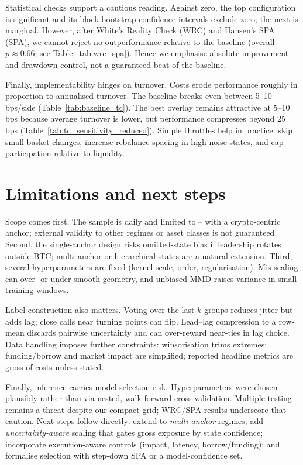 Statistical checks support a cautious reading. Against zero, the top configuration is significant and its block-bootstrap confidence intervals exclude zero; the next is marginal. However, after White’s Reality Check (WRC) and Hansen’s SPA (SPA), we cannot reject no outperformance relative to the baseline (overall \(p\approx0.66\); see Table~\ref{tab:wrc_spa}). Hence we emphasise absolute improvement and drawdown control, not a guaranteed beat of the baseline.

Finally, implementability hinges on turnover. Costs erode performance roughly in proportion to annualised turnover. The baseline breaks even between 5–10 bps/side (Table~\ref{tab:baseline_tc}). The best overlay remains attractive at 5–10 bps because average turnover is lower, but performance compresses beyond 25 bps (Table~\ref{tab:tc_sensitivity_reduced}). Simple throttles help in practice: skip small basket changes, increase rebalance spacing in high-noise states, and cap participation relative to liquidity.

\section{Limitations and next steps}\label{sec:disc:limits}

Scope comes first. The sample is daily and limited to \sampleStart{}–\sampleEnd{} with a crypto-centric anchor; external validity to other regimes or asset classes is not guaranteed. Second, the single-anchor design risks omitted-state bias if leadership rotates outside BTC; multi-anchor or hierarchical states are a natural extension. Third, several hyperparameters are fixed (kernel scale, order, regularisation). Mis-scaling can over- or under-smooth geometry, and unbiased MMD raises variance in small training windows.

Label construction also matters. Voting over the last \(k\) groups reduces jitter but adds lag; close calls near turning points can flip. Lead--lag compression to a row-mean discards pairwise uncertainty and can over-reward near-ties in lag choice. Data handling imposes further constraints: winsorisation trims extremes; funding/borrow and market impact are simplified; reported headline metrics are gross of costs unless stated.

Finally, inference carries model-selection risk. Hyperparameters were chosen plausibly rather than via nested, walk-forward cross-validation. Multiple testing remains a threat despite our compact grid; WRC/SPA results underscore that caution. Next steps follow directly: extend to \emph{multi-anchor} regimes; add \emph{uncertainty-aware} scaling that gates gross exposure by state confidence; incorporate execution-aware controls (impact, latency, borrow/funding); and formalise selection with step-down SPA or a model-confidence set.
